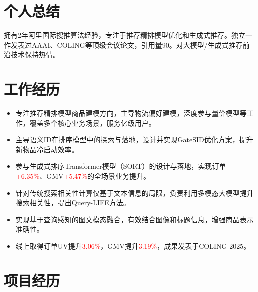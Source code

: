 \documentclass{resume}
\begin{document}



\vspace{0.5em}
\section{个人总结}
拥有2年阿里国际搜推算法经验，专注于推荐精排模型优化和生成式推荐。独立一作发表过AAAI、COLING等顶级会议论文，引用量90。对大模型/生成式推荐前沿技术保持热情。
\vspace{0.3em}

\section{工作经历}
\begin{itemize}
\item 专注推荐精排模型商品建模方向，主导物流偏好建模，深度参与量价模型等工作，覆盖多个核心业务场景，服务亿级用户。
  \item 主导语义ID在排序模型中的探索与落地，设计并实现GateSID优化方案，提升新物品冷启动效率。
  \item 参与生成式排序Transformer模型（SORT）的设计与落地，实现订单\textcolor{red}{+6.35\%}、GMV\textcolor{red}{+5.47\%}的全场景业务提升。
\end{itemize}

\begin{itemize}
  \item 针对传统搜索相关性计算仅基于文本信息的局限，负责利用多模态大模型提升搜索相关性，提出Query-LIFE方法。
  \item 实现基于查询感知的图文模态融合，有效结合图像和标题信息，增强商品表示准确性。
  \item 线上取得订单UV提升\textcolor{red}{3.06\%}，GMV提升\textcolor{red}{3.19\%}，成果发表于COLING 2025。
\end{itemize}


\section{项目经历}
\end{document}
